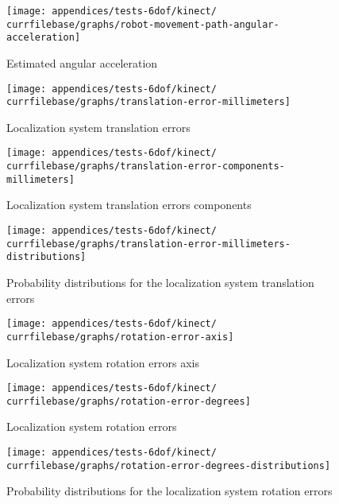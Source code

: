 \begin{figure}[H]
	\centering
	\texttt{[image: appendices/tests-6dof/kinect/\\currfilebase/graphs/robot-movement-path-angular-acceleration]}
	\caption{Estimated angular acceleration}
\end{figure}


\begin{figure}[H]
	\centering
	\texttt{[image: appendices/tests-6dof/kinect/\\currfilebase/graphs/translation-error-millimeters]}
	\caption{Localization system translation errors}
\end{figure}


\begin{figure}[H]
	\centering
	\texttt{[image: appendices/tests-6dof/kinect/\\currfilebase/graphs/translation-error-components-millimeters]}
	\caption{Localization system translation errors components}
\end{figure}


\begin{figure}[H]
	\centering
	\texttt{[image: appendices/tests-6dof/kinect/\\currfilebase/graphs/translation-error-millimeters-distributions]}
	\caption{Probability distributions for the localization system translation errors}
\end{figure}



\begin{figure}[H]
	\centering
	\texttt{[image: appendices/tests-6dof/kinect/\\currfilebase/graphs/rotation-error-axis]}
	\caption{Localization system rotation errors axis}
\end{figure}


\begin{figure}[H]
	\centering
	\texttt{[image: appendices/tests-6dof/kinect/\\currfilebase/graphs/rotation-error-degrees]}
	\caption{Localization system rotation errors}
\end{figure}


\begin{figure}[H]
	\centering
	\texttt{[image: appendices/tests-6dof/kinect/\\currfilebase/graphs/rotation-error-degrees-distributions]}
	\caption{Probability distributions for the localization system rotation errors}
\end{figure}


